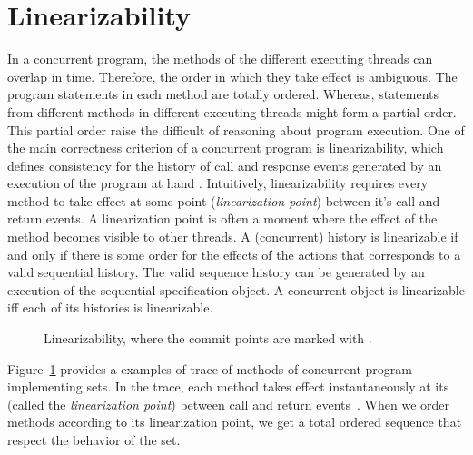 \section*{Linearizability}      
\label{section:specification:concurrent:data:structure}     
%         
\begingroup%
In a concurrent program, the methods of the different executing threads can overlap in time. Therefore, the order in which they take effect is ambiguous. The program statements 
in each method are totally ordered. Whereas, statements from different methods in different executing threads might form a partial order. This partial order raise the difficult of reasoning about program execution. One of the main correctness criterion of a concurrent program is linearizability, which defines consistency for the history
of call and response events generated by an execution of the program at hand \cite{HeWi:linearizability}. Intuitively, linearizability requires every method to take effect
at some point ({\emph {linearization point}}) between it's call and return events. A linearization point is often a moment where the effect of the method
becomes visible to other threads. A (concurrent) history is linearizable if and only if there is some order for
the effects of the actions that corresponds to a valid sequential history. The valid sequence history can be generated by an execution of the sequential specification object. A concurrent object is linearizable iff each of its histories
is linearizable.

\setlength\intextsep{\dazintextsep}
\begin{figure}[ht]
  \centering
  \caption{Linearizability, where the commit points are marked with \protect\commitpoint{}.}
  \label{figure:shape:linearizability}  
\end{figure}          
  

%
Figure~\ref{figure:shape:linearizability} provides a examples of trace of methods of concurrent program implementing sets.
In the trace, each method takes effect
instantaneously at its (called the \emph{linearization point})
between call and return events~\cite{HeWi:linearizability}. When we order methods according to its linearization point, we get a total ordered sequence that respect the behavior of the set.



\endgroup